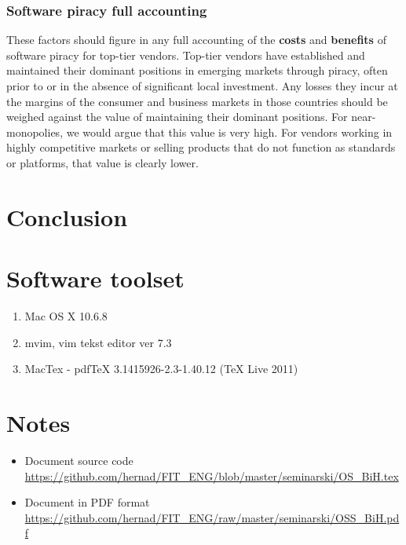 \documentclass[times, utf8, seminar]{fit}
\begin{document}
\subsection{Software piracy full accounting}

These factors should figure in any full accounting of the \textbf{costs} and \textbf{benefits} of software piracy for top-tier vendors. Top-tier vendors have established and maintained their dominant positions in emerging markets through piracy, often prior to or in the absence of significant local investment. Any losses they incur at the margins of the consumer and business markets in those countries should be weighed against the value of maintaining their dominant positions. For near-monopolies, we would argue that this value is very high. For vendors working in highly competitive markets or selling products that do not function as standards or platforms, that value is clearly lower.\citep{mediapiracy}


\chapter{Conclusion}




\appendix

\chapter{Software toolset}
\begin{enumerate}
  \item Mac OS X 10.6.8
  \item mvim, vim tekst editor ver 7.3
  \item MacTex - pdfTeX 3.1415926-2.3-1.40.12 (TeX Live 2011)
\end{enumerate}

\chapter{Notes}

\begin{itemize}
  \item Document source code \url{https://github.com/hernad/FIT_ENG/blob/master/seminarski/OS_BiH.tex}
  \item Document in PDF format \url{https://github.com/hernad/FIT_ENG/raw/master/seminarski/OSS_BiH.pdf}
\end{itemize}
\end{document}

